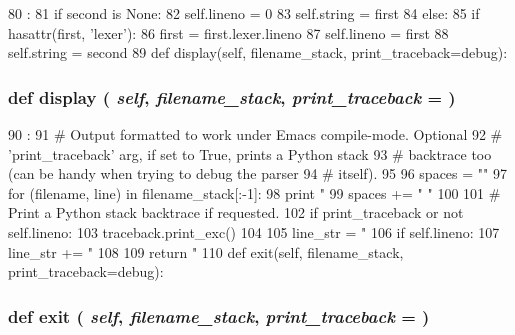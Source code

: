\begin{DoxyCode}
80                                           :
81         if second is None:
82             self.lineno = 0
83             self.string = first
84         else:
85             if hasattr(first, 'lexer'):
86                 first = first.lexer.lineno
87             self.lineno = first
88             self.string = second
89 
    def display(self, filename_stack, print_traceback=debug):
\end{DoxyCode}
\hypertarget{classisa__parser_1_1ISAParserError_a610714a2de3e4dadca4027bca4b71460}{
\subsubsection[{display}]{\setlength{\rightskip}{0pt plus 5cm}def display ( {\em self}, \/   {\em filename\_\-stack}, \/   {\em print\_\-traceback} = {})}}
\label{classisa__parser_1_1ISAParserError_a610714a2de3e4dadca4027bca4b71460}



\begin{DoxyCode}
90                                                             :
91         # Output formatted to work under Emacs compile-mode.  Optional
92         # 'print_traceback' arg, if set to True, prints a Python stack
93         # backtrace too (can be handy when trying to debug the parser
94         # itself).
95 
96         spaces = ""
97         for (filename, line) in filename_stack[:-1]:
98             print "%
99             spaces += "  "
100 
101         # Print a Python stack backtrace if requested.
102         if print_traceback or not self.lineno:
103             traceback.print_exc()
104 
105         line_str = "%
106         if self.lineno:
107             line_str += "%
108 
109         return "%
110 
    def exit(self, filename_stack, print_traceback=debug):
\end{DoxyCode}
\hypertarget{classisa__parser_1_1ISAParserError_a2279c3b889811e84135e2aa8e7fa5294}{
\subsubsection[{exit}]{\setlength{\rightskip}{0pt plus 5cm}def exit ( {\em self}, \/   {\em filename\_\-stack}, \/   {\em print\_\-traceback} = {})}}
\label{classisa__parser_1_1ISAParserError_a2279c3b889811e84135e2aa8e7fa5294}



